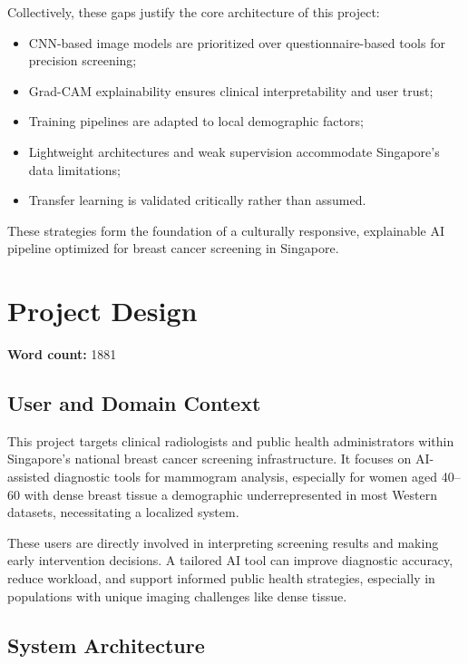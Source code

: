 \documentclass[12pt]{article}
\begin{document}
\vspace{0.5em}
Collectively, these gaps justify the core architecture of this project:
\begin{itemize}
    \item CNN-based image models are prioritized over questionnaire-based tools for precision screening;
    \item Grad-CAM explainability ensures clinical interpretability and user trust;
    \item Training pipelines are adapted to local demographic factors;
    \item Lightweight architectures and weak supervision accommodate Singapore's data limitations;
    \item Transfer learning is validated critically rather than assumed.
\end{itemize}

These strategies form the foundation of a culturally responsive, explainable AI pipeline optimized for breast cancer screening in Singapore.


\newpage
\section{Project Design}
\label{chapter3}
\noindent\textbf{Word count:} 1881
\vspace{1em}

\subsection{User and Domain Context}
This project targets clinical radiologists and public health administrators within Singapore’s national breast cancer screening infrastructure. It focuses on AI-assisted diagnostic tools for mammogram analysis, especially for women aged 40–60 with dense breast tissue a demographic underrepresented in most Western datasets, necessitating a localized system.

These users are directly involved in interpreting screening results and making early intervention decisions. A tailored AI tool can improve diagnostic accuracy, reduce workload, and support informed public health strategies, especially in populations with unique imaging challenges like dense tissue.

\subsection{System Architecture}
\end{document}
